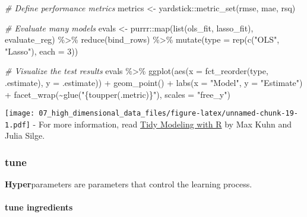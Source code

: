 \documentclass[
]{book}
\newenvironment{Shaded}{\begin{snugshade}}{\end{snugshade}}
\newcommand{\AttributeTok}[1]{\textcolor[rgb]{0.77,0.63,0.00}{#1}}
\newcommand{\CommentTok}[1]{\textcolor[rgb]{0.56,0.35,0.01}{\textit{#1}}}
\newcommand{\DecValTok}[1]{\textcolor[rgb]{0.00,0.00,0.81}{#1}}
\newcommand{\FunctionTok}[1]{\textcolor[rgb]{0.00,0.00,0.00}{#1}}
\newcommand{\NormalTok}[1]{#1}
\newcommand{\OtherTok}[1]{\textcolor[rgb]{0.56,0.35,0.01}{#1}}
\newcommand{\SpecialCharTok}[1]{\textcolor[rgb]{0.00,0.00,0.00}{#1}}
\newcommand{\StringTok}[1]{\textcolor[rgb]{0.31,0.60,0.02}{#1}}
\begin{document}
\begin{Shaded}
\begin{Highlighting}[]
\CommentTok{\# Define performance metrics }
\NormalTok{metrics }\OtherTok{\textless{}{-}}\NormalTok{ yardstick}\SpecialCharTok{::}\FunctionTok{metric\_set}\NormalTok{(rmse, mae, rsq)}

\CommentTok{\# Evaluate many models }
\NormalTok{evals }\OtherTok{\textless{}{-}}\NormalTok{ purrr}\SpecialCharTok{::}\FunctionTok{map}\NormalTok{(}\FunctionTok{list}\NormalTok{(ols\_fit, lasso\_fit), evaluate\_reg) }\SpecialCharTok{\%\textgreater{}\%}
  \FunctionTok{reduce}\NormalTok{(bind\_rows) }\SpecialCharTok{\%\textgreater{}\%}
  \FunctionTok{mutate}\NormalTok{(}\AttributeTok{type =} \FunctionTok{rep}\NormalTok{(}\FunctionTok{c}\NormalTok{(}\StringTok{"OLS"}\NormalTok{, }\StringTok{"Lasso"}\NormalTok{), }\AttributeTok{each =} \DecValTok{3}\NormalTok{))}

\CommentTok{\# Visualize the test results }
\NormalTok{evals }\SpecialCharTok{\%\textgreater{}\%}
  \FunctionTok{ggplot}\NormalTok{(}\FunctionTok{aes}\NormalTok{(}\AttributeTok{x =} \FunctionTok{fct\_reorder}\NormalTok{(type, .estimate), }\AttributeTok{y =}\NormalTok{ .estimate)) }\SpecialCharTok{+}
    \FunctionTok{geom\_point}\NormalTok{() }\SpecialCharTok{+}
    \FunctionTok{labs}\NormalTok{(}\AttributeTok{x =} \StringTok{"Model"}\NormalTok{,}
         \AttributeTok{y =} \StringTok{"Estimate"}\NormalTok{) }\SpecialCharTok{+}
    \FunctionTok{facet\_wrap}\NormalTok{(}\SpecialCharTok{\textasciitilde{}}\FunctionTok{glue}\NormalTok{(}\StringTok{"\{toupper(.metric)\}"}\NormalTok{), }\AttributeTok{scales =} \StringTok{"free\_y"}\NormalTok{) }
\end{Highlighting}
\end{Shaded}

\texttt{[image: 07\_high\_dimensional\_data\_files/figure-latex/unnamed-chunk-19-1.pdf]}
- For more information, read \href{https://www.tmwr.org/}{Tidy Modeling with R} by Max Kuhn and Julia Silge.

\hypertarget{tune}{%
\subsubsection{tune}\label{tune}}

\textbf{Hyper}parameters are parameters that control the learning process.

\hypertarget{tune-ingredients}{%
\paragraph{tune ingredients}\label{tune-ingredients}}
\end{document}
